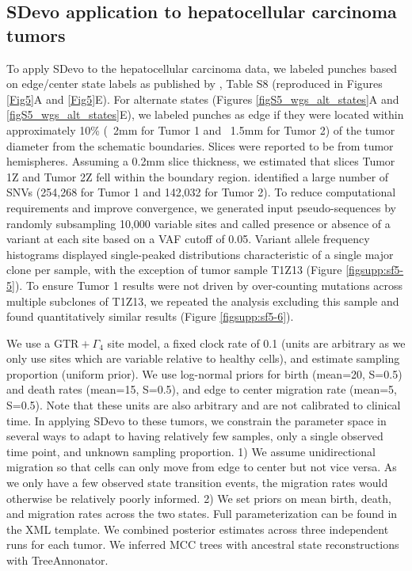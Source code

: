 \documentclass[12pt]{elife_based}
\begin{document}
\subsection*{SDevo application to hepatocellular carcinoma tumors}
To apply SDevo to the hepatocellular carcinoma data, we labeled punches based on edge/center state labels as published by \cite{Li2022}, Table S8 (reproduced in Figures \ref{Fig5}A and \ref{Fig5}E). For alternate states (Figures \ref{figS5_wgs_alt_states}A and \ref{figS5_wgs_alt_states}E), we labeled punches as edge if they were located within approximately 10\% (~2mm for Tumor 1 and ~1.5mm for Tumor 2) of the tumor diameter from the schematic boundaries. Slices were reported to be from tumor hemispheres. Assuming a 0.2mm slice thickness, we estimated that slices Tumor 1Z and Tumor 2Z fell within the boundary region. 
\cite{Li2022} identified a large number of SNVs (254,268 for Tumor 1 and 142,032 for Tumor 2). To reduce computational requirements and improve convergence, we generated input pseudo-sequences by randomly subsampling 10,000 variable sites and called presence or absence of a variant at each site based on a VAF cutoff of 0.05. Variant allele frequency histograms displayed single-peaked distributions characteristic of a single major clone per sample, with the exception of tumor sample T1Z13 (Figure \ref{figsupp:sf5-5}). To ensure Tumor 1 results were not driven by over-counting mutations across multiple subclones of T1Z13, we repeated the analysis excluding this sample and found quantitatively similar results (Figure \ref{figsupp:sf5-6}).  

We use a $\mathrm{GTR}+\Gamma_4$ site model, a fixed clock rate of 0.1 (units are arbitrary as we only use sites which are variable relative to healthy cells), and estimate sampling proportion (uniform prior). We use log-normal priors for birth (mean=20, S=0.5) and death rates (mean=15, S=0.5), and edge to center migration rate (mean=5, S=0.5). Note that these units are also arbitrary and are not calibrated to clinical time. In applying SDevo to these tumors, we constrain the parameter space in several ways to adapt to having relatively few samples, only a single observed time point, and unknown sampling proportion. 1) We assume unidirectional migration so that cells can only move from edge to center but not vice versa. As we only have a few observed state transition events, the migration rates would otherwise be relatively poorly informed. 2) We set priors on mean birth, death, and migration rates across the two states. Full parameterization can be found in the XML template. We combined posterior estimates across three independent runs for each tumor. We inferred MCC trees with ancestral state reconstructions with TreeAnnonator.
\end{document}
